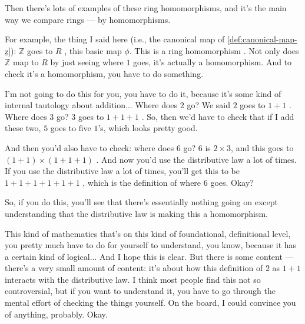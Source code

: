 \begin{speech}[00:25:08 - 00:27:20]
Then there's lots of examples  of these ring homomorphisms, and it's the main way we compare rings --- by homomorphisms.

For example, the thing I said here (i.e., the canonical map of \cref{def:canonical-map-z}): $\mathbb{Z}$ goes to $R$ , this basic map $\phi$. This is a ring homomorphism . Not only does $\mathbb{Z}$ map to $R$ by just seeing where $1$ goes, it's actually a homomorphism. And to check it's a homomorphism, you have to do something.

I'm not going to do this for you, you have to do it, because it's some kind of internal tautology about addition... Where does $2$ go? We said $2$ goes to $1 + 1$ . Where does $3$ go? $3$ goes to $1 + 1 + 1$ . So, then we'd have to check that if I add these two, $5$ goes to five $1$'s, which looks pretty good.

And then you'd also have to check: where does $6$ go? $6$ is $2 \times 3$, and this goes to $(1+1) \times (1+1+1)$ . And now you'd use the distributive law a lot of times. If you use the distributive law a lot of times, you'll get this to be $1 + 1 + 1 + 1 + 1 + 1$ , which is the definition of where $6$ goes. Okay?

So, if you do this, you'll see that there's essentially nothing going on except understanding that the distributive law is making this a homomorphism.

This kind of mathematics that's on this kind of foundational, definitional level, you pretty much have to do for yourself to understand, you know, because it has a certain kind of logical... And I hope this is clear. But there is some content --- there's a very small amount of content: it's about how this definition of $2$ as $1+1$ interacts with the distributive law. I think most people find this not so controversial, but if you want to understand it, you have to go through the mental effort of checking the things yourself. On the board, I could convince you of anything, probably. Okay.
\end{speech}

